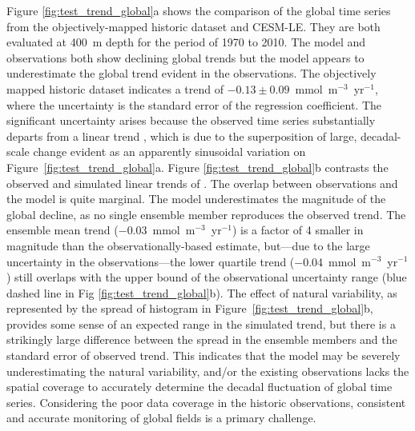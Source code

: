\documentclass[draft,linenumbers]{report_chapter}
\begin{document}
Figure \ref{fig:test_trend_global}a shows the comparison of the global  time series from the objectively-mapped historic  dataset \citep{Ito-Minobe-etal-2017} and CESM-LE.
They are both evaluated at 400~m depth for the period of 1970 to 2010.
The model and observations both show declining global  trends but the model appears to underestimate the global  trend evident in the observations.
The objectively mapped historic  dataset indicates a trend of $-0.13\pm0.09$~mmol~m$^{-3}$~yr$^{-1}$, where the uncertainty is the standard error of the regression coefficient.
The significant uncertainty arises because the observed time series substantially departs from a linear trend \citep{Santer-Mears-etal-2011}, which is due to the superposition of large, decadal-scale change evident as an apparently sinusoidal variation on Figure~\ref{fig:test_trend_global}a.
Figure \ref{fig:test_trend_global}b contrasts the observed and simulated linear trends of .
The overlap between observations and the model is quite marginal.
The model underestimates the magnitude of the global  decline, as no single ensemble member reproduces the observed trend.
The ensemble mean trend ($-0.03$~mmol~m$^{-3}$~yr$^{-1}$) is a factor of 4 smaller in magnitude than the observationally-based estimate, but---due to the large uncertainty in the observations---the lower quartile trend ($-$0.04~mmol~m$^{-3}$~yr$^{-1}$) still overlaps with the upper bound of the observational uncertainty range (blue dashed line in Fig \ref{fig:test_trend_global}b).
The effect of natural variability, as represented by the spread of histogram in Figure~\ref{fig:test_trend_global}b, provides some sense of an expected range in the simulated trend, but there is a strikingly large difference between the spread in the ensemble members and the standard error of observed trend.
This indicates that the model may be severely underestimating the natural variability, and/or the existing observations lacks the spatial coverage to accurately determine the decadal fluctuation of global  time series.
Considering the poor data coverage in the historic observations, consistent and accurate monitoring of global  fields is a primary challenge.
\end{document}
